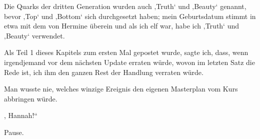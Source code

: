 
\begin{chapterOpeningAuthorNote}



Die Quarks der dritten Generation wurden auch ‚Truth‘ und ‚Beauty‘ genannt, bevor ‚Top‘ und ‚Bottom‘ sich durchgesetzt haben; mein Geburtsdatum stimmt in etwa mit dem von Hermine überein und als ich elf war, habe ich ‚Truth‘ und ‚Beauty‘ verwendet.

Als Teil 1 dieses Kapitels zum ersten Mal gepostet wurde, sagte ich, dass, wenn irgendjemand vor dem nächsten Update erraten würde, wovon im letzten Satz die Rede ist, ich ihm den ganzen Rest der Handlung verraten würde.
\end{chapterOpeningAuthorNote}
\begin{chapterOpeningQuote}
Man wusste nie, welches winzige Ereignis den eigenen Masterplan vom Kurs abbringen würde.
\end{chapterOpeningQuote}

, Hannah!“

\hplettrineextrapara
Pause.








